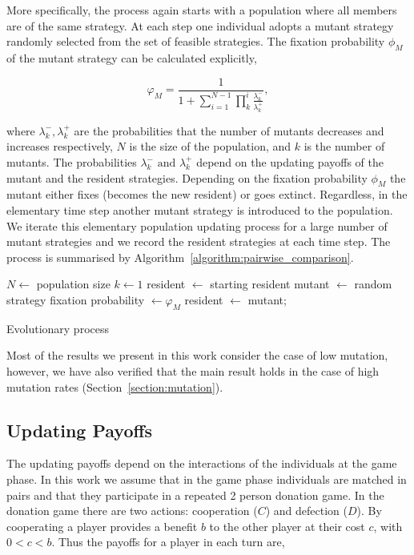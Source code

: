 \documentclass[11pt]{article}
\theoremstyle{plainCl1}
\theoremstyle{plainCl2}
\begin{document}
More specifically, the process again starts with a population where all members are of the same
strategy. At each step one individual adopts a mutant strategy randomly selected
from the set of feasible strategies. The fixation probability \(\phi_{M}\) of the
mutant strategy can be calculated explicitly,

\begin{equation}\label{eq:appendix_fixation_probability}
    \varphi_{M} = \frac{1}{1+\sum\limits_{i=1}^{N-1}\prod\limits_k^i \frac{\lambda^-_k}{\lambda^+_k}},
\end{equation}

where \(\lambda^-_k, \lambda^+_k\) are the probabilities that the number of
mutants decreases and increases respectively, \(N\) is the size of the
population, and \(k\) is the number of mutants. The probabilities \(\lambda^-_k
\text{ and } \lambda^+_k\) depend on the updating payoffs of the mutant and the
resident strategies. Depending on the fixation probability \(\phi_{M}\) the
mutant either fixes (becomes the new resident) or goes extinct. Regardless, in
the elementary time step another mutant strategy is introduced to the
population. We iterate this elementary population updating process for a large
number of mutant strategies and we record the resident strategies at each time
step. The process is summarised by Algorithm~\ref{algorithm:pairwise_comparison}.

\begin{algorithm}[!htbp]
  \SetAlgoLined
  $N \leftarrow$ population size\;
  $k \leftarrow 1$\; resident
   $\leftarrow$ starting resident\;
   {mutant $\leftarrow$ random strategy\;
   fixation probability $\leftarrow \varphi_M $\;
   {resident $\leftarrow$ mutant;}}
   \caption{Evolutionary process}\label{algorithm:pairwise_comparison}
\end{algorithm}

Most of the results we present in this work consider the case of low mutation,
however, we have also verified that the main result holds in the case of
high mutation rates (Section~\ref{section:mutation}).

\subsection{Updating Payoffs}\label{section:updating_payoffs}

The updating payoffs depend on the interactions of the individuals at the game
phase. In this work we assume that in the game phase individuals are matched in
pairs and that they participate in a repeated 2 person donation game. In the
donation game there are two actions: cooperation (\(C\)) and defection (\(D\)).
By cooperating a player provides a benefit \(b\) to the other player at their
cost \(c\), with \(0 < c < b\). Thus the payoffs for a player in each turn are,
\end{document}
